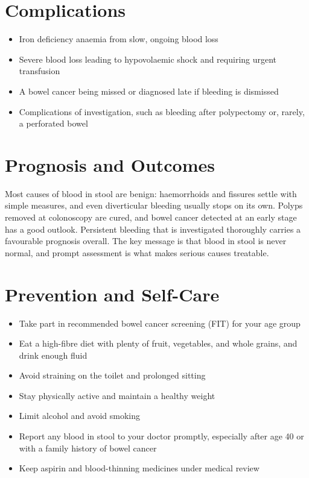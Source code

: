 \section*{Complications}
\begin{itemize}
    \item Iron deficiency anaemia from slow, ongoing blood loss
    \item Severe blood loss leading to hypovolaemic shock and requiring urgent transfusion
    \item A bowel cancer being missed or diagnosed late if bleeding is dismissed
    \item Complications of investigation, such as bleeding after polypectomy or, rarely, a perforated bowel
\end{itemize}

\section*{Prognosis and Outcomes}
Most causes of blood in stool are benign: haemorrhoids and fissures settle with simple measures, and even diverticular bleeding usually stops on its own. Polyps removed at colonoscopy are cured, and bowel cancer detected at an early stage has a good outlook. Persistent bleeding that is investigated thoroughly carries a favourable prognosis overall. The key message is that blood in stool is never normal, and prompt assessment is what makes serious causes treatable.

\section*{Prevention and Self-Care}
\begin{itemize}
    \item Take part in recommended bowel cancer screening (FIT) for your age group
    \item Eat a high-fibre diet with plenty of fruit, vegetables, and whole grains, and drink enough fluid
    \item Avoid straining on the toilet and prolonged sitting
    \item Stay physically active and maintain a healthy weight
    \item Limit alcohol and avoid smoking
    \item Report any blood in stool to your doctor promptly, especially after age 40 or with a family history of bowel cancer
    \item Keep aspirin and blood-thinning medicines under medical review
\end{itemize}

